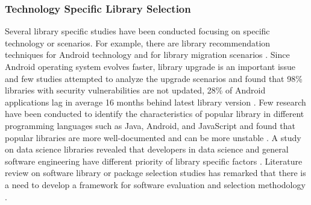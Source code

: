 
\subsubsection{Technology Specific Library Selection} Several library specific studies have been conducted focusing on specific technology or scenarios. For example, there are library recommendation techniques for Android technology \cite{moataz2020android-reco} and for library migration scenarios \cite{he2021migration}. Since Android operating system evolves faster, library upgrade is an important issue and few studies attempted to analyze the upgrade scenarios and found that 98\% libraries with security vulnerabilities are not updated, 28\% of Android applications lag in average 16 months behind latest library version \cite{aerr2017android-update, mcDonnell2013android-update-lagging, polese2022android-integration-history}. Few research have been conducted to identify the characteristics of popular library in different programming languages such as Java, Android, and JavaScript and found that popular libraries are more well-documented and can be more unstable \cite{sujahid2023popular-javascript, lima2020popular-characteristics}. A study on data science libraries revealed that developers in data science and general software engineering have different priority of library specific factors \cite{nadi2023datascience}. Literature review on software library or package selection studies has remarked that there is a need to develop a framework for software evaluation and selection  methodology \cite{jadhav2009review}.

